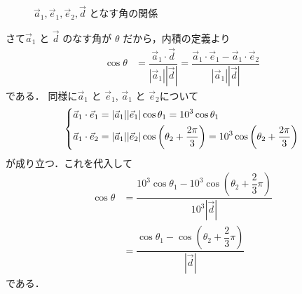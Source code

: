 \documentclass[../../main.tex]{subfiles}
\begin{document}
\begin{figure}[htb]
  \caption{$\vec{a}_1, \vec{e}_1, \vec{e}_2, \vec{d}$ となす角の関係}
  \label{fig:triangle_vector_angles_with_horizontal_axis}
\end{figure}

さて$\vec{a}_1$ と $\vec{d}$ のなす角が $\theta$ だから，内積の定義より
\begin{align}
  \cos \theta
  &= \dfrac{\vec{a}_1\cdot\vec{d}}{|\vec{a}_1||\vec{d}|}
  = \dfrac{\vec{a}_1\cdot\vec{e}_1 - \vec{a}_1\cdot\vec{e}_2}{|\vec{a}_1||\vec{d}|}
\end{align}
である．
同様に$\vec{a}_1$ と $\vec{e}_1$, $\vec{a}_1$ と $\vec{e}_2$について
\begin{align}
  \begin{dcases}
    \vec{a}_1\cdot\vec{e}_1=|\vec{a}_1||\vec{e}_1|\cos\theta_1=10^3\cos\theta_1 \\
    \vec{a}_1\cdot\vec{e}_2=|\vec{a}_1||\vec{e}_2|\cos\left(\theta_2+\dfrac{2\pi}{3}\right) =10^3\cos\left(\theta_2+\dfrac{2\pi}{3}\right)
  \end{dcases}
\end{align}
が成り立つ．これを代入して
\begin{align}
  \cos \theta
  & = \dfrac{10^3 \cos \theta_1 - 10^3 \cos(\theta_2 + \dfrac{2}{3}\pi)}{10^3 |\vec{d}|} \\
  & = \dfrac{\cos \theta_1 - \cos(\theta_2 + \dfrac{2}{3}\pi)}{|\vec{d}|} \label{eq:4}
\end{align}
である．
\end{document}
